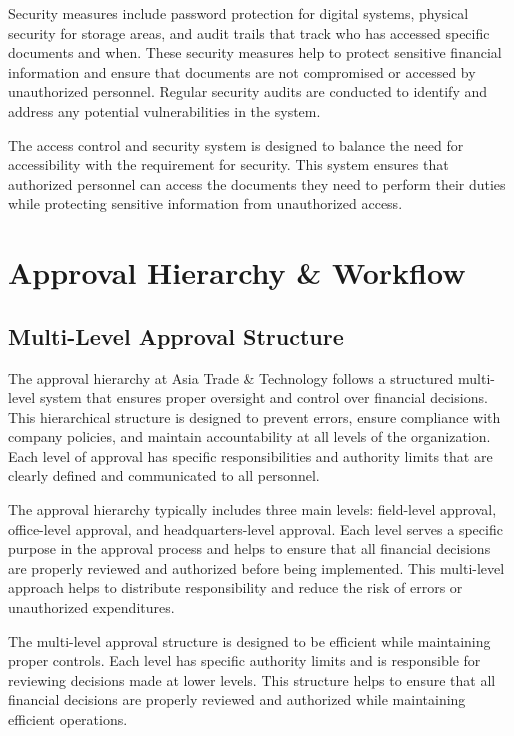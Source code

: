Security measures include password protection for digital systems, physical security for storage areas, and audit trails that track who has accessed specific documents and when. These security measures help to protect sensitive financial information and ensure that documents are not compromised or accessed by unauthorized personnel. Regular security audits are conducted to identify and address any potential vulnerabilities in the system.

The access control and security system is designed to balance the need for accessibility with the requirement for security. This system ensures that authorized personnel can access the documents they need to perform their duties while protecting sensitive information from unauthorized access.

\section{Approval Hierarchy \& Workflow}

\subsection{Multi-Level Approval Structure}
The approval hierarchy at Asia Trade \& Technology follows a structured multi-level system that ensures proper oversight and control over financial decisions. This hierarchical structure is designed to prevent errors, ensure compliance with company policies, and maintain accountability at all levels of the organization. Each level of approval has specific responsibilities and authority limits that are clearly defined and communicated to all personnel.

The approval hierarchy typically includes three main levels: field-level approval, office-level approval, and headquarters-level approval. Each level serves a specific purpose in the approval process and helps to ensure that all financial decisions are properly reviewed and authorized before being implemented. This multi-level approach helps to distribute responsibility and reduce the risk of errors or unauthorized expenditures.

The multi-level approval structure is designed to be efficient while maintaining proper controls. Each level has specific authority limits and is responsible for reviewing decisions made at lower levels. This structure helps to ensure that all financial decisions are properly reviewed and authorized while maintaining efficient operations.

